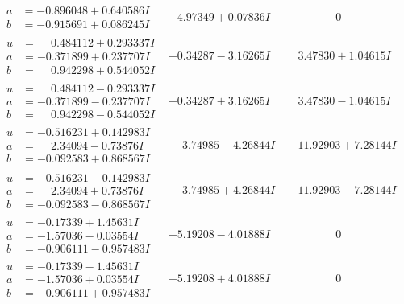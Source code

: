 \documentclass[1p]{elsarticle_modified}
\theoremstyle{definition}
\begin{document}
$$\begin{array}{c|c|c}
\begin{aligned}
a &= -0.896048 + 0.640586 I \\
b &= -0.915691 + 0.086245 I\end{aligned}
 & -4.97349 + 0.07836 I & \phantom{-0.000000 } 0 \\ \hline\begin{aligned}
u &= \phantom{-}0.484112 + 0.293337 I \\
a &= -0.371899 + 0.237707 I \\
b &= \phantom{-}0.942298 + 0.544052 I\end{aligned}
 & -0.34287 - 3.16265 I & \phantom{-}3.47830 + 1.04615 I \\ \hline\begin{aligned}
u &= \phantom{-}0.484112 - 0.293337 I \\
a &= -0.371899 - 0.237707 I \\
b &= \phantom{-}0.942298 - 0.544052 I\end{aligned}
 & -0.34287 + 3.16265 I & \phantom{-}3.47830 - 1.04615 I \\ \hline\begin{aligned}
u &= -0.516231 + 0.142983 I \\
a &= \phantom{-}2.34094 - 0.73876 I \\
b &= -0.092583 + 0.868567 I\end{aligned}
 & \phantom{-}3.74985 - 4.26844 I & \phantom{-}11.92903 + 7.28144 I \\ \hline\begin{aligned}
u &= -0.516231 - 0.142983 I \\
a &= \phantom{-}2.34094 + 0.73876 I \\
b &= -0.092583 - 0.868567 I\end{aligned}
 & \phantom{-}3.74985 + 4.26844 I & \phantom{-}11.92903 - 7.28144 I \\ \hline\begin{aligned}
u &= -0.17339 + 1.45631 I \\
a &= -1.57036 - 0.03554 I \\
b &= -0.906111 - 0.957483 I\end{aligned}
 & -5.19208 - 4.01888 I & \phantom{-0.000000 } 0 \\ \hline\begin{aligned}
u &= -0.17339 - 1.45631 I \\
a &= -1.57036 + 0.03554 I \\
b &= -0.906111 + 0.957483 I\end{aligned}
 & -5.19208 + 4.01888 I & \phantom{-0.000000 } 0 \\ \hline\begin{aligned}

\end{aligned}
\end{array}$$
\end{document}

